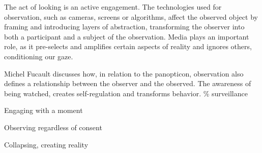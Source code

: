 The act of looking is an active engagement. The technologies used for observation, such as cameras, screens or algorithms, affect the observed object by framing and introducing layers of abstraction, transforming the observer into both a participant and a subject of the observation. Media plays an important role, as it pre-selects and amplifies certain aspects of reality and ignores others, conditioning our gaze.

Michel Fucault discusses how, in relation to the panopticon, observation also defines a relationship between the observer and the observed. The awareness of being watched, creates self-regulation and transforms behavior. {\scriptsize \textcolor{comment}{\%  surveillance }} \citep{foucault1975}


Engaging with a moment

Observing regardless of consent

Collapsing, creating reality


